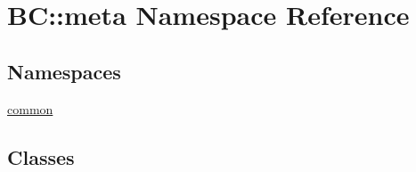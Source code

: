 \hypertarget{namespaceBC_1_1meta}{}\section{BC\+:\+:meta Namespace Reference}
\label{namespaceBC_1_1meta}
\subsection*{Namespaces}
\begin{DoxyCompactItemize}
\item 
 \hyperlink{namespaceBC_1_1meta_1_1common}{common}
\end{DoxyCompactItemize}
\subsection*{Classes}
